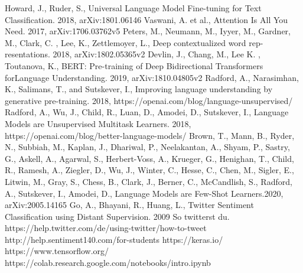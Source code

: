 \documentclass[12pt,german]{report}
\begin{document}

\newpage 
\thispagestyle{empty}
\quad 
\newpage

\tableofcontents
\newpage 
\thispagestyle{empty}
\quad 
\newpage


\newpage 
\thispagestyle{empty}
\quad 
\newpage


\begin{onehalfspace}




\end{onehalfspace}

\listoffigures

\begin{thebibliography}{}
 Howard, J., Ruder, S., Universal Language Model Fine-tuning for Text Classification. 2018,  arXiv:1801.06146 
 Vaswani, A. et al., Attention Is All You Need. 2017,  arXiv:1706.03762v5 
 Peters, M.,  Neumann, M.,  Iyyer, M., Gardner, M.,  Clark, C. , Lee, K., Zettlemoyer, L.,  Deep contextualized word rep-resentations. 2018, arXiv:1802.05365v2
 Devlin, J., Chang, M., Lee K. , Toutanova, K., BERT: Pre-training of Deep Bidirectional Transformers forLanguage Understanding. 2019, arXiv:1810.04805v2
 Radford,  A.,  Narasimhan,  K.,  Salimans,  T.,  and  Sutskever,  I., Improving language understanding by generative pre-training. 2018, https://openai.com/blog/language-unsupervised/
 Radford, A., Wu, J., Child, R., Luan, D., Amodei, D., Sutskever, I., Language Models are Unsupervised Multitask Learners. 2018, https://openai.com/blog/better-language-models/
 Brown, T., Mann, B., Ryder, N., Subbiah, M., Kaplan, J., Dhariwal, P., Neelakantan, A., Shyam, P., Sastry, G., Askell, A., Agarwal, S., Herbert-Voss, A., Krueger, G., Henighan, T., Child, R., Ramesh, A., Ziegler, D., Wu, J., Winter, C., Hesse, C., Chen, M., Sigler, E., Litwin, M., Gray, S., Chess, B., Clark, J., Berner, C., McCandlish, S., Radford, A., Sutskever, I., Amodei, D., Language Models are Few-Shot Learners.2020,  arXiv:2005.14165 
 Go, A., Bhayani, R., Huang, L., Twitter Sentiment Classification using Distant Supervision. 2009
 So twitterst du. https://help.twitter.com/de/using-twitter/how-to-tweet
 http://help.sentiment140.com/for-students
 https://keras.io/
 https://www.tensorflow.org/
 https://colab.research.google.com/notebooks/intro.ipynb
\end{thebibliography}
\end{document}
